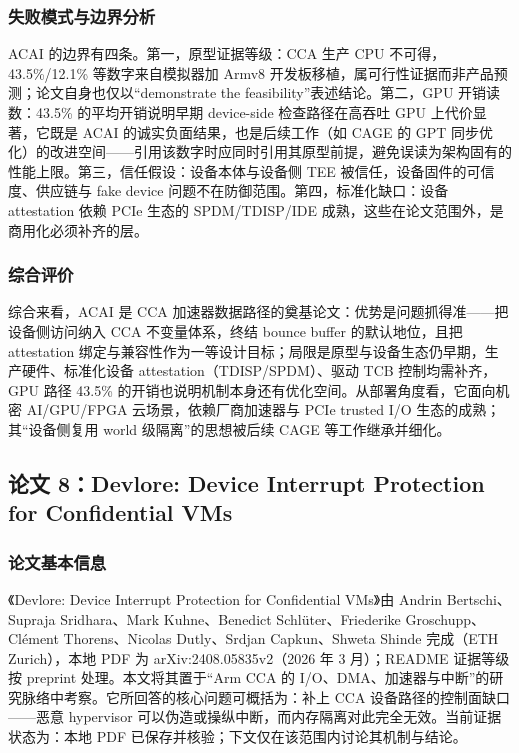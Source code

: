 \documentclass[11pt]{ctexart}
\begin{document}
\subsubsection{失败模式与边界分析}
ACAI 的边界有四条。第一，原型证据等级：CCA 生产 CPU 不可得，43.5\%/12.1\% 等数字来自模拟器加 Armv8 开发板移植，属可行性证据而非产品预测；论文自身也仅以“demonstrate the feasibility”表述结论。第二，GPU 开销读数：43.5\% 的平均开销说明早期 device-side 检查路径在高吞吐 GPU 上代价显著，它既是 ACAI 的诚实负面结果，也是后续工作（如 CAGE 的 GPT 同步优化）的改进空间——引用该数字时应同时引用其原型前提，避免误读为架构固有的性能上限。第三，信任假设：设备本体与设备侧 TEE 被信任，设备固件的可信度、供应链与 fake device 问题不在防御范围。第四，标准化缺口：设备 attestation 依赖 PCIe 生态的 SPDM/TDISP/IDE 成熟，这些在论文范围外，是商用化必须补齐的层。\par
\subsubsection{综合评价}
综合来看，ACAI 是 CCA 加速器数据路径的奠基论文：优势是问题抓得准——把设备侧访问纳入 CCA 不变量体系，终结 bounce buffer 的默认地位，且把 attestation 绑定与兼容性作为一等设计目标；局限是原型与设备生态仍早期，生产硬件、标准化设备 attestation（TDISP/SPDM）、驱动 TCB 控制均需补齐，GPU 路径 43.5\% 的开销也说明机制本身还有优化空间。从部署角度看，它面向机密 AI/GPU/FPGA 云场景，依赖厂商加速器与 PCIe trusted I/O 生态的成熟；其“设备侧复用 world 级隔离”的思想被后续 CAGE 等工作继承并细化。\par

\subsection{论文 8：Devlore: Device Interrupt Protection for Confidential VMs}
\subsubsection{论文基本信息}
《Devlore: Device Interrupt Protection for Confidential VMs》由 Andrin Bertschi、Supraja Sridhara、Mark Kuhne、Benedict Schlüter、Friederike Groschupp、Clément Thorens、Nicolas Dutly、Srdjan Capkun、Shweta Shinde 完成（ETH Zurich），本地 PDF 为 arXiv:2408.05835v2（2026 年 3 月）；README 证据等级按 preprint 处理。本文将其置于“Arm CCA 的 I/O、DMA、加速器与中断”的研究脉络中考察。它所回答的核心问题可概括为：补上 CCA 设备路径的控制面缺口——恶意 hypervisor 可以伪造或操纵中断，而内存隔离对此完全无效。当前证据状态为：本地 PDF 已保存并核验；下文仅在该范围内讨论其机制与结论。\cite{bertschi2026devlore}\par
\end{document}
